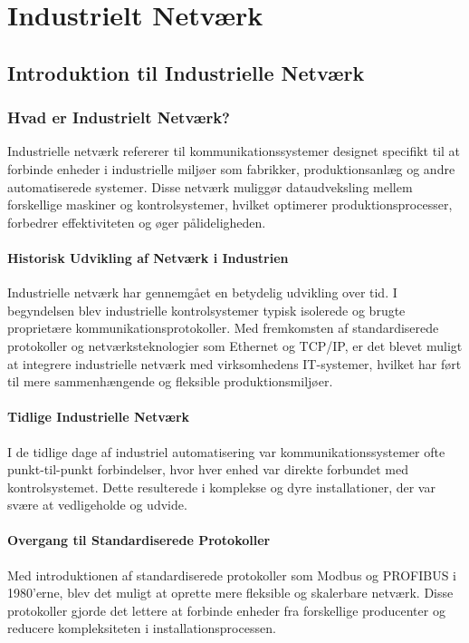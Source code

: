 \part{Industrielt Netværk}
\chapter{Introduktion til Industrielle Netværk}
\label{chapter:introduktion_industrielle_netværk}
\section{Hvad er Industrielt Netværk?}
Industrielle netværk refererer til kommunikationssystemer designet specifikt til at forbinde enheder i industrielle miljøer som fabrikker, produktionsanlæg og andre automatiserede systemer. Disse netværk muliggør dataudveksling mellem forskellige maskiner og kontrolsystemer, hvilket optimerer produktionsprocesser, forbedrer effektiviteten og øger pålideligheden.

\subsection{Historisk Udvikling af Netværk i Industrien}
Industrielle netværk har gennemgået en betydelig udvikling over tid. I begyndelsen blev industrielle kontrolsystemer typisk isolerede og brugte proprietære kommunikationsprotokoller. Med fremkomsten af standardiserede protokoller og netværksteknologier som Ethernet og TCP/IP, er det blevet muligt at integrere industrielle netværk med virksomhedens IT-systemer, hvilket har ført til mere sammenhængende og fleksible produktionsmiljøer.

\subsection{Tidlige Industrielle Netværk}
I de tidlige dage af industriel automatisering var kommunikationssystemer ofte punkt-til-punkt forbindelser, hvor hver enhed var direkte forbundet med kontrolsystemet. Dette resulterede i komplekse og dyre installationer, der var svære at vedligeholde og udvide.

\subsection{Overgang til Standardiserede Protokoller}
Med introduktionen af standardiserede protokoller som Modbus og PROFIBUS i 1980'erne, blev det muligt at oprette mere fleksible og skalerbare netværk. Disse protokoller gjorde det lettere at forbinde enheder fra forskellige producenter og reducere kompleksiteten i installationsprocessen.

